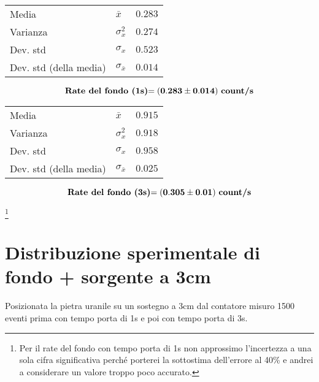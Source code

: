 \documentclass{article}
\begin{document}
\begin{minipage}[c]{0.45\textwidth}
\vspace{1cm}
\begin{center}
\hspace{0.5cm}
\begin{tabular}{llr}
	Media                       & $\bar{x}$             & $0.283$       \\		
	Varianza                    & $\sigma_{x}^2$          & $0.274$     \\
	Dev. std                    & $\sigma_{x}$              & $0.523$   \\
	Dev. std (della media)      & $\sigma_{\bar{x}}$    & $0.014$       \\
\end{tabular}
\end{center}

\[ 
	\text{\textbf{Rate del fondo (1s)}} \mathbf{ = \left(0.283 \pm 0.014\right)}\text{ \textbf{count/s}}
\]
\end{minipage}
\hfill
\begin{minipage}[c]{0.45\textwidth}
\vspace{1cm}
\begin{center}
\begin{tabular}{llr}
	Media                       & $\bar{x}$             & $0.915$       \\		
	Varianza                    & $\sigma_{x}^2$          & $0.918$     \\
	Dev. std                    & $\sigma_{x}$              & $0.958$   \\
	Dev. std (della media)      & $\sigma_{\bar{x}}$    & $0.025$       \\
\end{tabular}
\end{center}

\[ 
	\text{\textbf{Rate del fondo (3s)}}  \mathbf{ = \left(0.305 \pm 0.01 \right)} \text{ \textbf{count/s}}
\]
\end{minipage}
\footnote{Per il rate del fondo con tempo porta di 1s non approssimo l'incertezza a una sola cifra significativa perché porterei la sottostima dell'errore al 40\% e andrei a considerare un valore troppo poco accurato.}



\newpage
\section{Distribuzione sperimentale di fondo + sorgente a 3cm}
Posizionata la pietra uranile su un sostegno a 3cm dal contatore misuro 1500 eventi prima con tempo porta di 1s e poi con tempo porta di 3s. 
\end{document}
